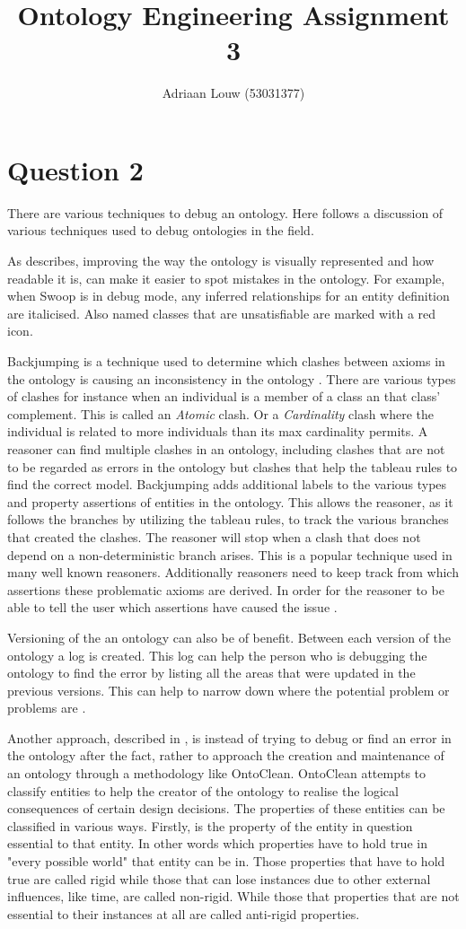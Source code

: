 \documentclass[12pt,a4paper]{article}
\title{Ontology Engineering Assignment 3}
\author{Adriaan Louw (53031377)}
\begin{document}
\section{Question 2}
There are various techniques to debug an ontology. Here follows a discussion of various techniques used to debug ontologies in the field.

As \cite{Parsia} describes, improving the way the ontology is visually represented and how readable it is, can make it easier to spot mistakes in the ontology. For example, when Swoop is in debug mode, any inferred relationships for an entity definition are italicised. Also named classes that are unsatisfiable are marked with a red icon. 

Backjumping is a technique used to determine which clashes between axioms in the ontology is causing an inconsistency in the ontology \citep{Parsia}. There are various types of clashes for instance when an individual is a member of a class an that class' complement. This is called an \emph{Atomic} clash. Or a \emph{Cardinality} clash where the individual is related to more individuals than its max cardinality permits. A reasoner can find multiple clashes in an ontology, including clashes that are not to be regarded as errors in the ontology but clashes that help the tableau rules to find the correct model. Backjumping adds additional labels to the various types and property assertions of entities in the ontology. This allows the reasoner, as it follows the branches by utilizing the tableau rules, to track the various branches that created the clashes. The reasoner will stop when a clash that does not depend on a non-deterministic branch arises. This is a popular technique used in many well known reasoners. Additionally reasoners need to keep track from which assertions these problematic axioms are derived. In order for the reasoner to be able to tell the user which assertions have caused the issue \citep{Parsia}. 

Versioning of the an ontology can also be of benefit. Between each version of the ontology a log is created. This log can help the person who is debugging the ontology to find the error by listing all the areas that were updated in the previous versions. This can help to narrow down where the potential problem or problems are \citep{Parsia}.   

Another approach, described in \cite{Guarino2009}, is instead of trying to debug or find an error in the ontology after the fact, rather to approach the creation and maintenance of an ontology through a methodology like OntoClean. OntoClean attempts to classify entities to help the creator of the ontology to realise the logical consequences of certain design decisions. The properties of these entities can be classified in various ways. Firstly, is the property of the entity in question essential to that entity. In other words which properties have to hold true in "every possible world" that entity can be in. Those properties that have to hold true are called rigid while those that can lose instances due to other external influences, like time, are called non-rigid. While those that properties that are not essential to their instances at all are called anti-rigid properties. 
\end{document}
